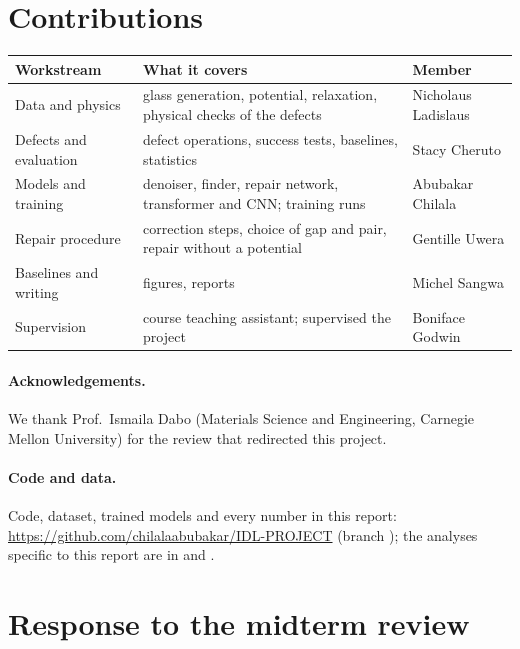 \documentclass[10pt]{article}
\newcommand{\repo}{\url{https://github.com/chilalaabubakar/IDL-PROJECT}}
\begin{document}
\section*{Contributions}
{\footnotesize\setlength{\tabcolsep}{4pt}
\begin{tabularx}{\linewidth}{@{}l>{\raggedright\arraybackslash}Xl@{}}
\toprule
Workstream & What it covers & Member \\
\midrule
Data and physics & glass generation, potential, relaxation, physical checks of the defects & Nicholaus Ladislaus \\
Defects and evaluation & defect operations, success tests, baselines, statistics & Stacy Cheruto \\
Models and training & denoiser, finder, repair network, transformer and CNN; training runs & Abubakar Chilala \\
Repair procedure & correction steps, choice of gap and pair, repair without a potential & Gentille Uwera \\
Baselines and writing & figures, reports & Michel Sangwa \\
Supervision & course teaching assistant; supervised the project & Boniface Godwin \\
\bottomrule
\end{tabularx}}

\paragraph{Acknowledgements.} We thank Prof.\ Ismaila Dabo (Materials Science and Engineering, Carnegie Mellon University) for the review that redirected this project.

\paragraph{Code and data.} {\raggedright Code, dataset, trained models and every number in this report: \repo{} (branch ); the analyses specific to this report are in  and .\par}


{\small}

\appendix
\section{Response to the midterm review}
\label{app:midterm}
\end{document}
